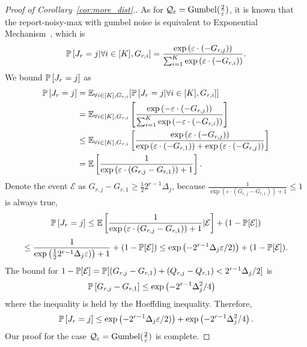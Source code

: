 \begin{proof}[Proof of Corollary~\ref{cor:more_dist}.]
As for $\mathcal{Q}_{\varepsilon}=\mathrm{Gumbel}(\frac{2}{\varepsilon})$, it is known that the report-noisy-max with gumbel noise is equivalent to Exponential Mechanism~\citep{mcsherry2007mechanism,qiao2021oneshot}, which is
$$\mathbb{P}\left[J_r = j|\forall i\in [K], G_{r, i} \right] = \frac{\exp\left( \varepsilon\cdot (-G_{r, j} ) \right)}{\sum_{i=1}^K\exp\left( \varepsilon\cdot (-G_{r, i}) \right)}.$$
We bound $\mathbb{P}\left[J_r = j\right]$ as
\begin{align*}
	\mathbb{P}\left[J_r = j\right] & =\mathbb{E}_{\forall i\in [K], G_{r, i}}[\mathbb{P}\left[J_r = j|\forall i\in [K], G_{r, i} \right]]\\
	&= \mathbb{E}_{\forall i\in [K], G_{r, i}}\left[\frac{\exp\left( -\varepsilon\cdot (-G_{r, j} ) \right)}{\sum_{i=1}^K\exp\left( -\varepsilon\cdot (-G_{r, i}) \right)}\right]\\
	&\leq \mathbb{E}_{\forall i\in [K], G_{r, i}}\left[\frac{\exp\left( \varepsilon\cdot (-G_{r, j}) \right)}{\exp\left( \varepsilon\cdot (-G_{r, 1} ) \right) + \exp\left( \varepsilon\cdot (-G_{r, j}) \right)}\right]\\
	& = \mathbb{E}\left[\frac{1}{\exp\left( \varepsilon\cdot (G_{r, j}-G_{r, 1}) \right) + 1}\right].
\end{align*}
Denote the event $\mathcal{E}$ as $G_{r, j}-G_{r, 1} \geq \frac{1}{2}2^{r-1}\Delta_j$, because $\frac{1}{\exp\left( \varepsilon\cdot (G_{r, j}-G_{r, 1}) \right) + 1}\leq 1$ is always true,
$$
\mathbb{P}\left[J_r = j\right] \leq \mathbb{E}\left[\frac{1}{\exp\left( \varepsilon\cdot (G_{r, j}-G_{r, 1}) \right) + 1}| \mathcal{E} \right] + (1 - \mathbb{P}[\mathcal{E}])
$$
$$
\leq \frac{1}{\exp\left(  \frac{1}{2}2^{r-1}\Delta_j \varepsilon) \right) + 1} + (1 - \mathbb{P}[\mathcal{E}]) \leq \exp\left( -2^{r-1}\Delta_j \varepsilon/2)\right)  + (1 - \mathbb{P}[\mathcal{E}]).
$$
The bound for $1 - \mathbb{P}[\mathcal{E}] = \mathbb{P}[(G_{r, j}-G_{r, 1}) + (Q_{r, j} - Q_{r, 1}) < 2^{r-1}\Delta_j/2]$ is
\begin{align*}
&\mathbb{P}\left[G_{r, j}-G_{r, 1}\right] \leq \exp\left(-2^{r-1}\Delta_j^2/4\right)
\end{align*}
where the inequality is held by the Hoeffding inequality. Therefore, 
$$
\mathbb{P}\left[J_r = j\right] \leq \exp\left( -2^{r-1}\Delta_j \varepsilon/2)\right) + \exp\left(-2^{r-1}\Delta_j^2/4\right).
$$
Our proof for the case $\mathcal{Q}_{\varepsilon}=\mathrm{Gumbel}(\frac{2}{\varepsilon})$ is complete.
\end{proof}


